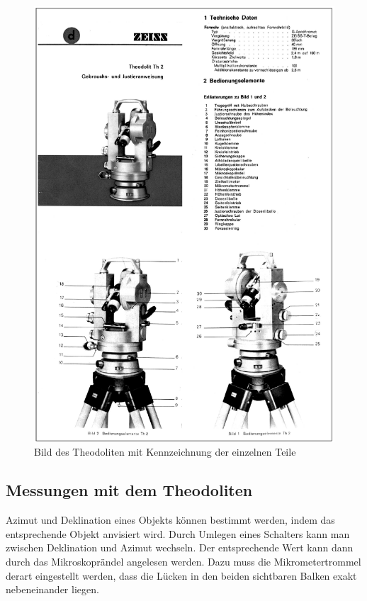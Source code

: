 \begin{figure}
\includegraphics[width=1\textwidth]{images/theodolit}
\caption{Bild des Theodoliten mit Kennzeichnung der einzelnen Teile}
\label{fig:Theodolit}
\end{figure}

\subsection{Messungen mit dem Theodoliten}
Azimut und Deklination eines Objekts können bestimmt werden, indem das entsprechende Objekt anvisiert wird. Durch Umlegen eines Schalters kann man zwischen Deklination und Azimut wechseln. Der entsprechende Wert kann dann durch das Mikroskoprändel angelesen werden. Dazu muss die Mikrometertrommel derart eingestellt werden, dass die Lücken in den beiden sichtbaren Balken exakt nebeneinander liegen. 

